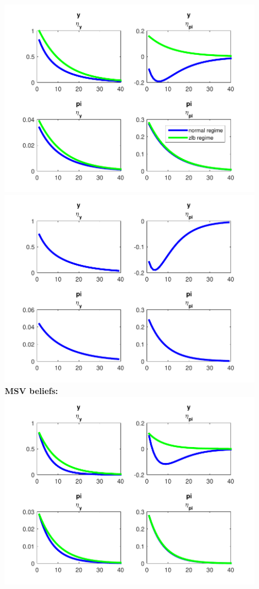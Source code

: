 \documentclass[12pt,reqno]{article}
\numberwithin{equation}{section}
\begin{document}
\begin{figure}[H]
\includegraphics[scale=0.6]{NKPC_ree_init_REE_MS_IR.pdf}
\includegraphics[scale=0.6]{NKPC_ree_init_REE_IR.pdf}\\

\textbf{MSV beliefs: }\\

\includegraphics[scale=0.6]{NKPC_ree_init_MSV_IR.pdf}\\
\end{figure}
\end{document}
